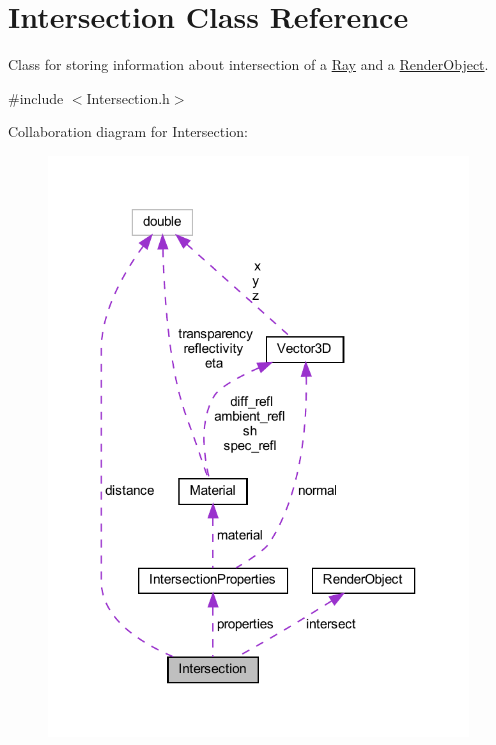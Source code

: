 \hypertarget{classIntersection}{}\section{Intersection Class Reference}
\label{classIntersection}


Class for storing information about intersection of a \mbox{\hyperlink{classRay}{Ray}} and a \mbox{\hyperlink{classRenderObject}{Render\+Object}}.  




{\ttfamily \#include $<$Intersection.\+h$>$}



Collaboration diagram for Intersection\+:
\nopagebreak
\begin{figure}[H]
\begin{center}
\leavevmode
\includegraphics[width=316pt]{classIntersection__coll__graph}
\end{center}
\end{figure}
